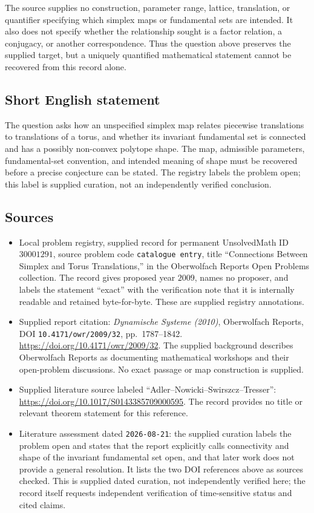 \documentclass[11pt]{article}
\begin{document}
The source supplies no construction, parameter range, lattice, translation, or quantifier specifying which simplex maps or fundamental sets are intended. It also does not specify whether the relationship sought is a factor relation, a conjugacy, or another correspondence. Thus the question above preserves the supplied target, but a uniquely quantified mathematical statement cannot be recovered from this record alone.
\subsection{Short English statement}
The question asks how an unspecified simplex map relates piecewise translations to translations of a torus, and whether its invariant fundamental set is connected and has a possibly non-convex polytope shape. The map, admissible parameters, fundamental-set convention, and intended meaning of shape must be recovered before a precise conjecture can be stated. The registry labels the problem open; this label is supplied curation, not an independently verified conclusion.
\subsection{Sources}
\begin{itemize}
\item Local problem registry, supplied record for permanent UnsolvedMath ID \(30001291\), source problem code \texttt{catalogue entry}, title ``Connections Between Simplex and Torus Translations,'' in the Oberwolfach Reports Open Problems collection. The record gives proposed year \(2009\), names no proposer, and labels the statement ``exact'' with the verification note that it is internally readable and retained byte-for-byte. These are supplied registry annotations.
\item Supplied report citation: \emph{Dynamische Systeme (2010)}, Oberwolfach Reports, DOI \texttt{10.4171/owr/2009/32}, pp.\ 1787--1842. \url{https://doi.org/10.4171/owr/2009/32}. The supplied background describes Oberwolfach Reports as documenting mathematical workshops and their open-problem discussions. No exact passage or map construction is supplied.
\item Supplied literature source labeled ``Adler--Nowicki--Swirszcz--Tresser'': \url{https://doi.org/10.1017/S0143385709000595}. The record provides no title or relevant theorem statement for this reference.
\item Literature assessment dated \texttt{2026-08-21}: the supplied curation labels the problem open and states that the report explicitly calls connectivity and shape of the invariant fundamental set open, and that later work does not provide a general resolution. It lists the two DOI references above as sources checked. This is supplied dated curation, not independently verified here; the record itself requests independent verification of time-sensitive status and cited claims.
\end{itemize}
\end{document}
